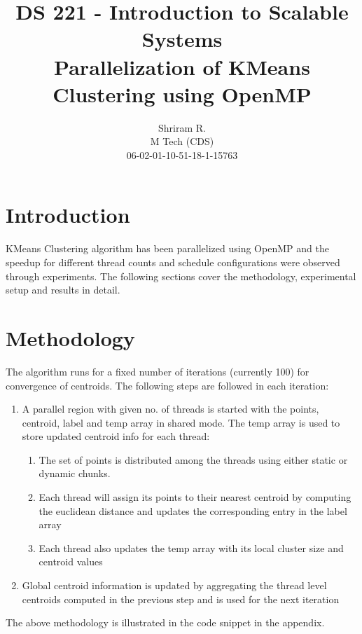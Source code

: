 \documentclass[11pt,a4paper,oneside]{article}
\begin{document}
	\title{DS 221 - Introduction to Scalable Systems \\ Parallelization of KMeans Clustering using OpenMP}
	\author{Shriram R. \\ M Tech (CDS) \\ 06-02-01-10-51-18-1-15763}
	\maketitle
	
	\section{Introduction}
	KMeans Clustering algorithm has been parallelized using OpenMP and the speedup for different thread counts and schedule configurations were observed through experiments. The following sections cover the methodology, experimental setup and results in detail.
	
	\section{Methodology}
	The algorithm runs for a fixed number of iterations (currently 100) for convergence of centroids. The following steps are followed in each iteration:
	\begin{enumerate}
		\item A parallel region with given no. of threads is started with the points, centroid, label and temp array in shared mode. The temp array is used to store updated centroid info for each thread:
		\begin{enumerate}
		\item The set of points is distributed among the threads using either static or dynamic chunks.
		\item Each thread will assign its points to their nearest centroid by computing the euclidean distance and updates the corresponding entry in the label array
		\item Each thread also updates the temp array with its local cluster size and centroid values
	    \end{enumerate}
		\item Global centroid information is updated by aggregating the thread level centroids computed in the previous step and is used for the next iteration
	\end{enumerate}
    The above methodology is illustrated in the code snippet in the appendix.
	
	
\end{document}

